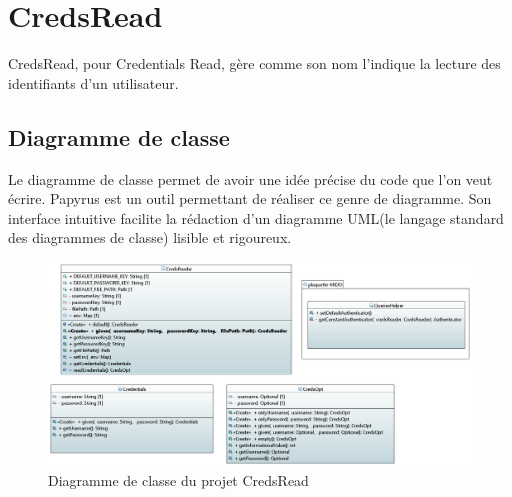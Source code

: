 \chapter[CredsRead]{CredsRead\raisebox{.3\baselineskip}{\normalsize\footnotemark}}

CredsRead, pour Credentials Read, gère comme son nom l'indique la lecture des identifiants d'un utilisateur.

\section{Diagramme de classe}
Le diagramme de classe permet de avoir une idée précise du code que l'on veut écrire. Papyrus est un outil permettant de réaliser ce genre de diagramme. Son interface intuitive facilite la rédaction d'un diagramme UML(le langage standard des diagrammes de classe) lisible et rigoureux. 

\begin{figure}[!h]
    \begin{center}
    \includegraphics[width=\textwidth]{assets/doc.png}
    \end{center}
    \caption{Diagramme de classe du projet CredsRead}
\end{figure}